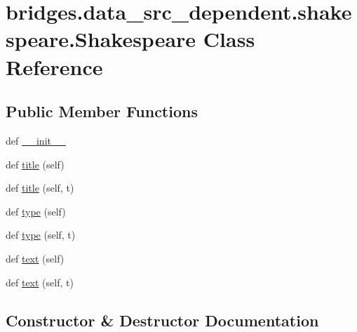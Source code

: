 \hypertarget{classbridges_1_1data__src__dependent_1_1shakespeare_1_1_shakespeare}{}\section{bridges.\+data\+\_\+src\+\_\+dependent.\+shakespeare.\+Shakespeare Class Reference}
\label{classbridges_1_1data__src__dependent_1_1shakespeare_1_1_shakespeare}
\subsection*{Public Member Functions}
\begin{DoxyCompactItemize}
\item 
def \hyperlink{classbridges_1_1data__src__dependent_1_1shakespeare_1_1_shakespeare_a22b3c0d1bcce2f1c7f7845b9db8a8610}{\+\_\+\+\_\+init\+\_\+\+\_\+}
\item 
def \hyperlink{classbridges_1_1data__src__dependent_1_1shakespeare_1_1_shakespeare_a3bd228852c9e0fc4653ada17f1803c15}{title} (self)
\item 
def \hyperlink{classbridges_1_1data__src__dependent_1_1shakespeare_1_1_shakespeare_abbf3b79e27e5e4afc1040a340dbf4d49}{title} (self, t)
\item 
def \hyperlink{classbridges_1_1data__src__dependent_1_1shakespeare_1_1_shakespeare_ae2499dd686160849220edc662246e42a}{type} (self)
\item 
def \hyperlink{classbridges_1_1data__src__dependent_1_1shakespeare_1_1_shakespeare_a9b4489402fda80ec8360bb17ad3d0af9}{type} (self, t)
\item 
def \hyperlink{classbridges_1_1data__src__dependent_1_1shakespeare_1_1_shakespeare_a588e767fe0f474440f2b9a1fda8ede96}{text} (self)
\item 
def \hyperlink{classbridges_1_1data__src__dependent_1_1shakespeare_1_1_shakespeare_af81f61dc7578547f5ed42792fc36e37a}{text} (self, t)
\end{DoxyCompactItemize}


\subsection{Constructor \& Destructor Documentation}
\mbox{\label{classbridges_1_1data__src__dependent_1_1shakespeare_1_1_shakespeare_a22b3c0d1bcce2f1c7f7845b9db8a8610}} 
